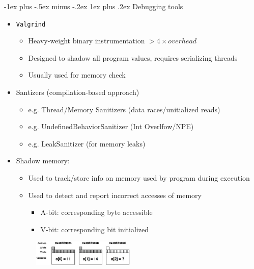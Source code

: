 \documentclass[10pt,landscape]{article}
\makeatletter
\newcommand{\subsubsubsection}{\@startsection{subsubsection}{3}{0mm}%
                                {-1ex plus -.5ex minus -.2ex}%
                                {1ex plus .2ex}%
                                {\normalfont\scriptsize\bfseries}}
\makeatother
\begin{document}
\begin{multicols*}{3}
\subsubsubsection{Debugging tools}
\begin{itemize}[topsep=0pt,noitemsep,wide=0pt, leftmargin=\dimexpr{} + 2\relax]
    \item \verb|Valgrind|
    \begin{itemize}[topsep=0pt,noitemsep,wide=0pt, leftmargin=\dimexpr{} + 2\relax]
        \item Heavy-weight binary instrumentation $>4\times overhead$
        \item Designed to shadow all program values, requires serializing threads
        \item Usually used for memory check
    \end{itemize}
    \item Santizers (compilation-based approach)
    \begin{itemize}[topsep=0pt,noitemsep,wide=0pt, leftmargin=\dimexpr{} + 2\relax]
        \item e.g. Thread/Memory Sanitizers (data races/unitialized reads)
        \item e.g. UndefinedBehaviorSanitizer (Int Overlfow/NPE)
        \item e.g. LeakSanitizer (for memory leaks)
    \end{itemize}
\end{itemize}
\begin{itemize}[topsep=0pt,noitemsep,wide=0pt, leftmargin=\dimexpr{} + 2\relax]
    \item Shadow memory:
    \begin{itemize}[topsep=0pt,noitemsep,wide=0pt, leftmargin=\dimexpr{} + 2\relax]
        \item Used to track/store info on memory used by program during execution
        \item Used to detect and report incorrect accesses of memory
        \begin{itemize}[topsep=0pt,noitemsep,wide=0pt, leftmargin=\dimexpr{} + 2\relax]
            \item A-bit: corresponding byte accessible
            \item V-bit: corresponding bit initialized
        \end{itemize}
    \end{itemize}
\end{itemize}

\includegraphics*[width=8.2cm, height=1.2cm]{images/shadowmemory.jpg}


\end{multicols*}
\end{document}
